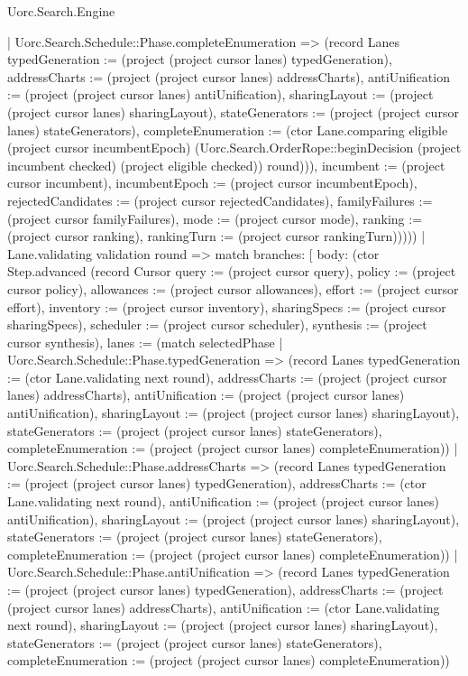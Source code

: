\begin{lexlean}{Uorc.Search.Engine}
\begin{semanticmodule}
{{        | Uorc.Search.Schedule::Phase.completeEnumeration => (record Lanes {typedGeneration := (project (project cursor lanes) typedGeneration), addressCharts := (project (project cursor lanes) addressCharts), antiUnification := (project (project cursor lanes) antiUnification), sharingLayout := (project (project cursor lanes) sharingLayout), stateGenerators := (project (project cursor lanes) stateGenerators), completeEnumeration := (ctor Lane.comparing eligible (project cursor incumbentEpoch) (Uorc.Search.OrderRope::beginDecision (project incumbent checked) (project eligible checked)) round)})), incumbent := (project cursor incumbent), incumbentEpoch := (project cursor incumbentEpoch), rejectedCandidates := (project cursor rejectedCandidates), familyFailures := (project cursor familyFailures), mode := (project cursor mode), ranking := (project cursor ranking), rankingTurn := (project cursor rankingTurn)}))))
    | Lane.validating validation round => match{
      branches: [
        {
          body: (ctor Step.advanced (record Cursor {query := (project cursor query), policy := (project cursor policy), allowances := (project cursor allowances), effort := (project cursor effort), inventory := (project cursor inventory), sharingSpecs := (project cursor sharingSpecs), scheduler := (project cursor scheduler), synthesis := (project cursor synthesis), lanes := (match selectedPhase
            | Uorc.Search.Schedule::Phase.typedGeneration => (record Lanes {typedGeneration := (ctor Lane.validating next round), addressCharts := (project (project cursor lanes) addressCharts), antiUnification := (project (project cursor lanes) antiUnification), sharingLayout := (project (project cursor lanes) sharingLayout), stateGenerators := (project (project cursor lanes) stateGenerators), completeEnumeration := (project (project cursor lanes) completeEnumeration)})
            | Uorc.Search.Schedule::Phase.addressCharts => (record Lanes {typedGeneration := (project (project cursor lanes) typedGeneration), addressCharts := (ctor Lane.validating next round), antiUnification := (project (project cursor lanes) antiUnification), sharingLayout := (project (project cursor lanes) sharingLayout), stateGenerators := (project (project cursor lanes) stateGenerators), completeEnumeration := (project (project cursor lanes) completeEnumeration)})
            | Uorc.Search.Schedule::Phase.antiUnification => (record Lanes {typedGeneration := (project (project cursor lanes) typedGeneration), addressCharts := (project (project cursor lanes) addressCharts), antiUnification := (ctor Lane.validating next round), sharingLayout := (project (project cursor lanes) sharingLayout), stateGenerators := (project (project cursor lanes) stateGenerators), completeEnumeration := (project (project cursor lanes) completeEnumeration)})
}}}}
\end{semanticmodule}
\end{lexlean}
